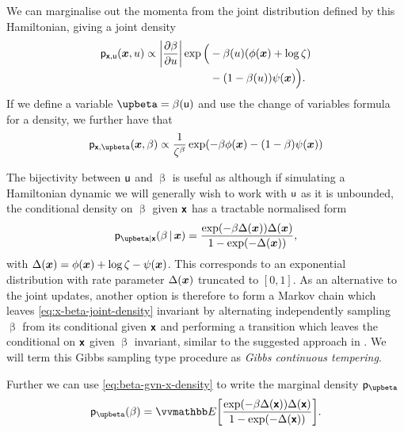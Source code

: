 We can marginalise out the momenta from the joint distribution defined by this Hamiltonian, giving a joint density
\begin{equation}\label{eq:x-u-joint-density}
\begin{split}
\pden{\rvct{x},\rvar{u}}(\vct{x},u) \propto \left|\pd{\beta}{u}\right| 
\exp\Big(&
  -\beta(u)\lpa \phi(\vct{x}) + \log\zeta\rpa\\[-1mm]
  &- \lpa 1 - \beta(u)\rpa\psi(\vct{x})
\Big).
\end{split}
\end{equation}
If we define a variable $\upbeta = \beta(\rvar{u})$ and use the change of variables formula for a density, we further have that
\begin{equation}\label{eq:x-beta-joint-density}
\pden{\rvct{x},\upbeta}(\vct{x},\beta) \propto \frac{1}{\zeta^\beta}
\exp \lpa
  -\beta \phi(\vct{x}) - ( 1 - \beta)\psi(\vct{x})
\rpa
\end{equation}

The bijectivity between $\mathsf{u}$ and $\upbeta$ is useful as although if simulating a Hamiltonian dynamic we will generally wish to work with $\mathsf{u}$ as it is unbounded, the conditional density on $\upbeta$ given $\boldsymbol{\mathsf{x}}$ has a tractable normalised form
\begin{equation}\label{eq:beta-gvn-x-density}
\pden{\upbeta|\rvct{x}}(\beta \gvn\vct{x}) = 
\frac{\exp\lpa - \beta\Delta(\vct{x})\rpa\Delta(\vct{x})}{1 - \exp\lpa-\Delta(\vct{x})\rpa},
\end{equation}
with $\Delta(\boldsymbol{x}) = \phi(\boldsymbol{x}) + \log\zeta - \psi(\boldsymbol{x})$. This corresponds to an exponential distribution with rate parameter $\Delta(\boldsymbol{x})$ truncated to $[0, 1]$. As an alternative to the joint updates, another option is therefore to form a Markov chain which leaves \eqref{eq:x-beta-joint-density} invariant by alternating independently sampling $\upbeta$ from its conditional given $\boldsymbol{\mathsf{x}}$ and performing a transition which leaves the conditional on $\boldsymbol{\mathsf{x}}$ given $\upbeta$ invariant, similar to the suggested approach in \citep{gelman1998simulating}. We will term this Gibbs sampling type procedure as \emph{Gibbs continuous tempering}.

Further we can use \eqref{eq:beta-gvn-x-density} to write the marginal density $\pden{\upbeta}$
\begin{equation}\label{eq:ct-beta-marginal}
\pden{\upbeta}(\beta) =
\expc{\frac{\exp\lpa - \beta\Delta(\rvct{x})\rpa\Delta(\rvct{x})}{1 - \exp\lpa-\Delta(\rvct{x})\rpa}}.
\end{equation}

